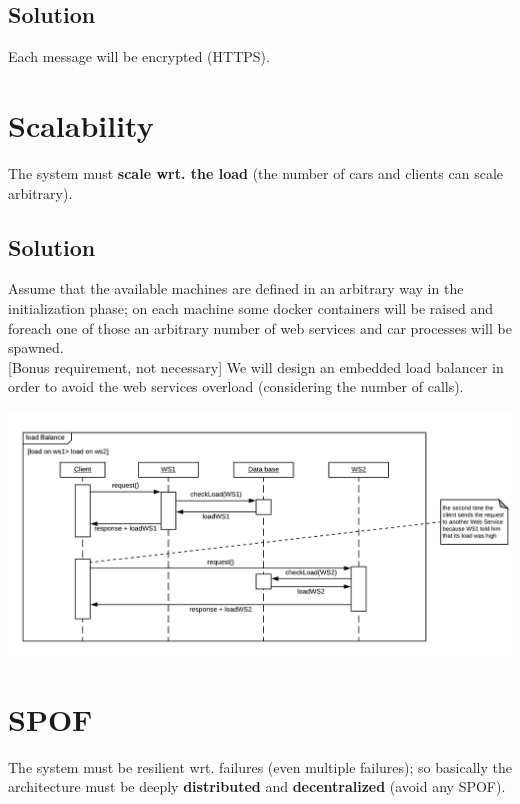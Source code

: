 \subsection{Solution}

Each message will be encrypted (HTTPS).


\section{Scalability}

The system must \textbf{scale wrt. the load} 
(the number of cars and clients can scale arbitrary).


\subsection{Solution}

Assume that the available machines are defined in an arbitrary 
way in the initialization phase; on each machine some docker containers 
will be raised and foreach one of those an arbitrary number of web services and 
car processes will be spawned.\\


[Bonus requirement, not necessary]
We will design an embedded load balancer in order to avoid the web services overload 
(considering the number of calls).

\begin{center}
    \includegraphics[scale=0.6]{assets/ds2019_2.png}
\end{center}


\section{SPOF}

The system must be resilient wrt. failures (even multiple failures);
so basically the architecture must be deeply \textbf{distributed} 
and \textbf{decentralized} (avoid any SPOF). 


